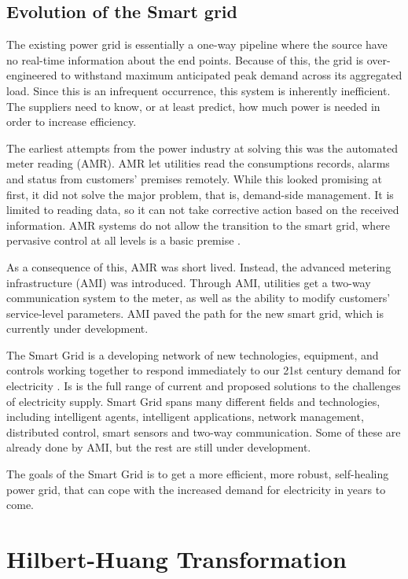 \documentclass[12pt]{article}
\begin{document}
\subsection{Evolution of the Smart grid}
\label{smartGrid}
The existing power grid is essentially a one-way pipeline where the source have no real-time information about the end points. Because of this, the grid is over-engineered to withstand maximum anticipated peak demand across its aggregated load. Since this is an infrequent occurrence, this system is inherently inefficient. The suppliers need to know, or at least predict, how much power is needed in order to increase efficiency. 

The earliest attempts from the power industry at solving this was the automated meter reading (AMR). AMR let utilities read the consumptions records, alarms and status from customers' premises remotely. While this looked promising at first, it did not solve the major problem, that is, demand-side management. It is limited to reading data, so it can not take corrective action based on the received information. AMR systems do not allow the transition to the smart grid, where pervasive control at all levels is a basic premise \cite{smartgridPath}.

As a consequence of this, AMR was short lived. Instead, the advanced metering infrastructure (AMI) was introduced. Through AMI, utilities get a two-way communication system to the meter, as well as the ability to modify customers' service-level parameters. AMI paved the path for the new smart grid, which is currently under development.

The Smart Grid is a developing network of new technologies, equipment, and controls working together to respond immediately to our 21st century demand for electricity \cite{smartGridGov}. Is is the full range of current and proposed solutions to the challenges of electricity supply. Smart Grid spans many different fields and technologies, including intelligent agents, intelligent applications, network management, distributed control, smart sensors and two-way communication. Some of these are already done by AMI, but the rest are still under development. 

The goals of the Smart Grid is to get a more efficient, more robust, self-healing power grid, that can cope with the increased demand for electricity in years to come.



\section{Hilbert-Huang Transformation}
\label{hilbertHuangTransformation}
\end{document}

